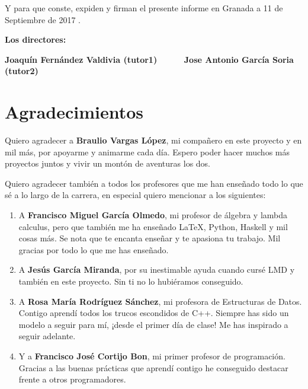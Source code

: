 \vspace{0.5cm}

Y para que conste, expiden y firman el presente informe en Granada a 11 de Septiembre de 2017 .

\vspace{1cm}

\textbf{Los directores:}

\vspace{5cm}

\noindent \textbf{Joaquín Fernández Valdivia (tutor1) \ \ \ \ \ Jose Antonio García Soria (tutor2)}

\chapter*{Agradecimientos}
\thispagestyle{empty}

       \vspace{1cm}


Quiero agradecer a \textbf{Braulio Vargas López}, mi compañero en este proyecto y en mil más, por apoyarme y animarme cada día. Espero poder hacer muchos más proyectos juntos y vivir un montón de aventuras los dos.

Quiero agradecer también a todos los profesores que me han enseñado todo lo que sé a lo largo de la carrera, en especial quiero mencionar a los siguientes:

\begin{enumerate}[---]
	\item A \textbf{Francisco Miguel García Olmedo}, mi profesor de álgebra y lambda calculus, pero que también me ha enseñado \LaTeX, Python, Haskell y mil cosas más. Se nota que te encanta enseñar y te apasiona tu trabajo. Mil gracias por todo lo que me has enseñado.
	\item A \textbf{Jesús García Miranda}, por su inestimable ayuda cuando cursé LMD y también en este proyecto. Sin ti no lo hubiéramos conseguido.
	\item A \textbf{Rosa María Rodríguez Sánchez}, mi profesora de Estructuras de Datos. Contigo aprendí todos los trucos escondidos de C++. Siempre has sido un modelo a seguir para mí, ¡desde el primer día de clase! Me has inspirado a seguir adelante.
	\item Y a \textbf{Francisco José Cortijo Bon}, mi primer profesor de programación. Gracias a las buenas prácticas que aprendí contigo he conseguido destacar frente a otros programadores.
\end{enumerate}

